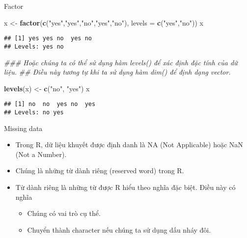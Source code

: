 \documentclass[
  ignorenonframetext,
]{beamer}
\newenvironment{Shaded}{}{}
\newcommand{\CommentTok}[1]{\textcolor[rgb]{0.38,0.63,0.69}{\textit{#1}}}
\newcommand{\DataTypeTok}[1]{\textcolor[rgb]{0.56,0.13,0.00}{#1}}
\newcommand{\KeywordTok}[1]{\textcolor[rgb]{0.00,0.44,0.13}{\textbf{#1}}}
\newcommand{\NormalTok}[1]{#1}
\newcommand{\StringTok}[1]{\textcolor[rgb]{0.25,0.44,0.63}{#1}}
\providecommand{\tightlist}{%
  \setlength{\itemsep}{0pt}\setlength{\parskip}{0pt}}
\begin{document}
\begin{frame}[fragile]{Factor}
\protect\hypertarget{factor-3}{}

\begin{Shaded}
\begin{Highlighting}[]
\NormalTok{x <-}\StringTok{ }\KeywordTok{factor}\NormalTok{(}\KeywordTok{c}\NormalTok{(}\StringTok{"yes"}\NormalTok{,}\StringTok{"yes"}\NormalTok{,}\StringTok{"no"}\NormalTok{,}\StringTok{"yes"}\NormalTok{,}\StringTok{"no"}\NormalTok{), }\DataTypeTok{levels =} \KeywordTok{c}\NormalTok{(}\StringTok{"yes"}\NormalTok{,}\StringTok{"no"}\NormalTok{))}
\NormalTok{x}
\end{Highlighting}
\end{Shaded}

\begin{verbatim}
## [1] yes yes no  yes no 
## Levels: yes no
\end{verbatim}

\begin{Shaded}
\begin{Highlighting}[]
\CommentTok{### Hoặc chúng ta có thể sử dụng hàm levels() để xác định đặc tính của dữ liệu. }
\CommentTok{## Điều này tương tự khi ta sử dụng hàm dim() để định dạng vector.}

\KeywordTok{levels}\NormalTok{(x) <-}\StringTok{ }\KeywordTok{c}\NormalTok{(}\StringTok{"no"}\NormalTok{, }\StringTok{"yes"}\NormalTok{) }
\NormalTok{x}
\end{Highlighting}
\end{Shaded}

\begin{verbatim}
## [1] no  no  yes no  yes
## Levels: no yes
\end{verbatim}

\end{frame}

\begin{frame}{Missing data}
\protect\hypertarget{missing-data}{}

\begin{itemize}[<+->]
\item
  Trong R, dữ liệu khuyết được định danh là NA (Not Applicable) hoặc NaN
  (Not a Number).
\item
  Chúng là những từ dành riêng (reserved word) trong R.
\item
  Từ dành riêng là những từ được R hiểu theo nghĩa đặc biệt. Điều này có
  nghĩa

  \begin{itemize}[<+->]
  \tightlist
  \item
    Chúng có vai trò cụ thể.\\
  \item
    Chuyển thành character nếu chúng ta sử dụng dấu nháy đôi.
  \end{itemize}
\end{itemize}

\end{frame}
\end{document}
